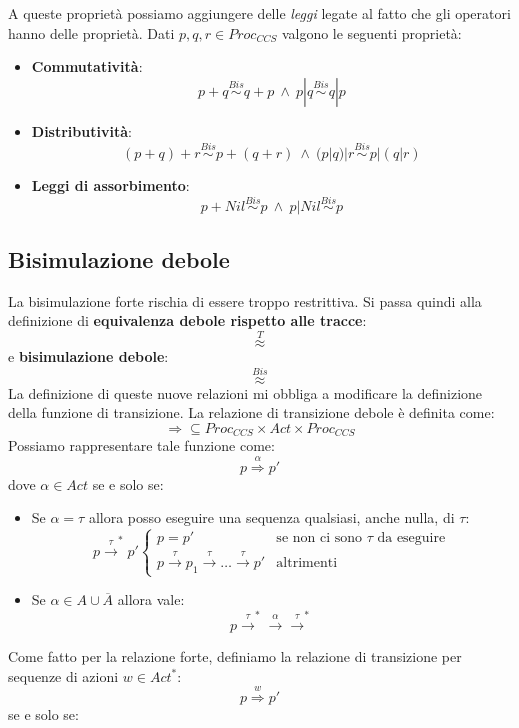 A queste proprietà possiamo aggiungere delle \textit{leggi} legate al fatto che
gli operatori hanno delle proprietà. Dati $p, q, r \in Proc_{CCS}$ valgono le seguenti proprietà:
\begin{itemize}
    \item \textbf{Commutatività}: $$p + q \stackrel{Bis}{\sim} q + p \ \land \ p | q \stackrel{Bis}{\sim} q | p$$
    \item \textbf{Distributività}: $$(p + q) + r \stackrel{Bis}{\sim} p + (q + r) \ \land \ (p | q) | r \stackrel{Bis}{\sim} p | (q | r)$$
    \item \textbf{Leggi di assorbimento}: $$p + Nil \stackrel{Bis}{\sim} p \ \land \ p | Nil \stackrel{Bis}{\sim} p$$
\end{itemize}
\subsection{Bisimulazione debole}
La bisimulazione forte rischia di essere troppo restrittiva. Si passa quindi alla
definizione di \textbf{equivalenza debole rispetto alle tracce}: $$\stackrel{T}{\approx}$$
e \textbf{bisimulazione debole}: $$\stackrel{Bis}{\approx}$$
La definizione di queste nuove relazioni mi obbliga a modificare la definizione
della funzione di transizione. La relazione di transizione debole è definita come:
$$\Rightarrow \subseteq Proc_{CCS} \times Act \times Proc_{CCS}$$ Possiamo
rappresentare tale funzione come: $$p \stackrel{\alpha}{\Rightarrow} p'$$ dove
$\alpha \in Act$ se e solo se:
\begin{itemize}
    \item Se $\alpha = \tau$ allora posso eseguire una sequenza qualsiasi, anche
          nulla, di $\tau$: $$p \xrightarrow{\tau}^{\ast} p'\begin{cases}
                  p = p'                                                                  & \text{se non ci sono } \tau \text{ da eseguire} \\
                  p \xrightarrow{\tau} p_1 \xrightarrow{\tau} \dots \xrightarrow{\tau} p' & \text{altrimenti}
              \end{cases}$$
    \item Se $\alpha \in A \cup \overline{A}$ allora vale:
          $$p \xrightarrow{\tau}^{\ast} \xrightarrow{\alpha} \xrightarrow{\tau}^{\ast}$$
\end{itemize}
Come fatto per la relazione forte, definiamo la relazione di transizione per
sequenze di azioni $w \in Act^{\ast}$: $$p \stackrel{w}{\Rightarrow} p'$$ se e solo se:
